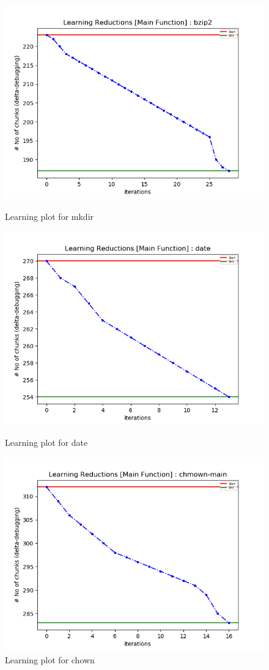 \documentclass{relatorio}
\begin{document}
	\begin{figure}[H]
	\centering
	\captionsetup{justification=centering}
	\includegraphics[width=0.65\linewidth]{imgs/chisel_learning_mkdir_plot.png}
	\caption{Learning plot for \color{blue} mkdir}%
	\label{fig:plant}
	\centering
	\captionsetup{justification=centering}
	\includegraphics[width=0.65\linewidth]{imgs/chisel_learning_date_plot.png}
	\caption{Learning plot for \color{blue} date}%
	\label{fig:plant}
	\centering
	\captionsetup{justification=centering}
	\includegraphics[width=0.65\linewidth]{imgs/chisel_learning_chmown-main_plot.png}
	\caption{Learning plot for \color{blue} chown}%
	\label{fig:plant}
	\centering
	\captionsetup{justification=centering}

\end{figure}
\end{document}
